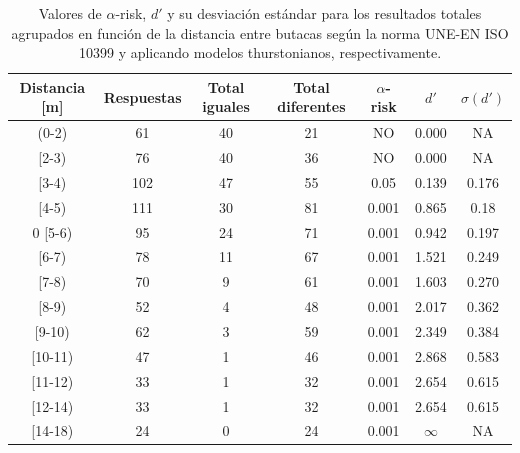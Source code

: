 \documentclass[11pt,a4paper,twoside]{book}
\begin{document}
            \begin{table}[H]
			\begin{center}
			\begin{scriptsize}
			\begin{tabular}{| c | c | c | c || c | c | c |}
			    \hline
				\textbf{Distancia [m]}&\textbf{Respuestas}&\textbf{Total iguales}&\textbf{Total diferentes}&\textbf{$\alpha$-risk}&\textbf{$d'$}&\textbf{$\sigma (d')$}\\ \hline
                (0-2)&61&40&21&NO&0.000&NA\\ \hline
                [2-3)&76&40&36&NO&0.000&NA\\ \hline
                [3-4)&102&47&55&0.05&0.139&0.176\\ \hline
                [4-5)&111&30&81&0.001&0.865&0.18\\ \hline0
                [5-6)&95&24&71&0.001&0.942&0.197\\ \hline
                [6-7)&78&11&67&0.001&1.521&0.249\\ \hline
                [7-8)&70&9&61&0.001&1.603&0.270\\ \hline
                [8-9)&52&4&48&0.001&2.017&0.362\\ \hline
                [9-10)&62&3&59&0.001&2.349&0.384\\ \hline
                [10-11)&47&1&46&0.001&2.868&0.583\\ \hline
                [11-12)&33&1&32&0.001&2.654&0.615\\ \hline
                [12-14)&33&1&32&0.001&2.654&0.615\\ \hline
                [14-18)&24&0&24&0.001&$\infty$&NA\\ \hline
			\end{tabular}
			\caption{Valores de $\alpha$-risk, $d'$ y su desviación estándar para los resultados totales agrupados en función de la distancia entre butacas según la norma UNE-EN ISO 10399 y aplicando modelos thurstonianos, respectivamente.}
			\label{tablaButacasDuda}
			\end{scriptsize}
			\end{center}	
		    \end{table}
		    
\end{document}
